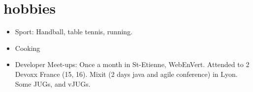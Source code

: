 \documentclass[]{k-cv} %
\begin{document}
\section{hobbies}
\vspace{-0.2cm}
\begin{freetext}
{
\begin{itemize}
  \item
  Sport: Handball, table tennis, running.
  \item
  Cooking
  \item
  Developer Meet-ups: Once a month in St-Etienne, WebEnVert.
  Attended to 2 Devoxx France (15, 16).
  Mixit (2 days java and agile conference) in Lyon. Some JUGs, and vJUGs.
\end{itemize}
}
\end{freetext}
\end{document}
